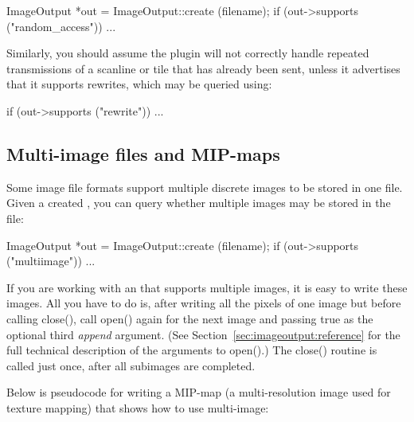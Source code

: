 \begin{code}
        ImageOutput *out = ImageOutput::create (filename);
        if (out->supports ("random_access"))
            ...
\end{code}

\noindent Similarly, you should assume the plugin will not correctly
handle repeated transmissions of a scanline or tile that has already
been sent, unless it advertises that it supports rewrites, which may be
queried using:

\begin{code}
        if (out->supports ("rewrite"))
            ...
\end{code}


\subsection{Multi-image files and MIP-maps}
\label{sec:imageoutput:multiimage}

Some image file formats support multiple discrete images to be stored
in one file.  Given a created \ImageOutput, you can query whether
multiple images may be stored in the file:

\begin{code}
        ImageOutput *out = ImageOutput::create (filename);
        if (out->supports ("multiimage"))
            ...
\end{code}

If you are working with an \ImageOutput that supports multiple images,
it is easy to write these images.  All you have to do is, after writing
all the pixels of one image but before calling {\cf close()}, call {\cf
  open()} again for the next image and passing {\cf true} as the
optional third \emph{append} argument.  (See
Section~\ref{sec:imageoutput:reference} for the full technical
description of the arguments to {\cf open()}.)  The {\cf close()}
routine is called just once, after all subimages are completed.

Below is pseudocode for writing a MIP-map (a multi-resolution image
used for texture mapping) that shows how to use multi-image:

